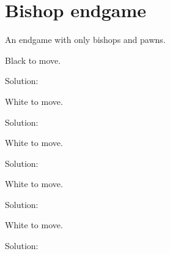 \documentclass{book}
\begin{document}
\section{Bishop endgame}
An endgame with only bishops and pawns.\begin{multicols}{2} 
\begin{samepage} 
\newgame 


 
\showboard
 
 Black to move. 
 
Solution: 
 
\end{samepage}\begin{samepage} 
\newgame 


 
\showboard
 
 White to move. 
 
Solution: 
 
\end{samepage}\begin{samepage} 
\newgame 


 
\showboard
 
 White to move. 
 
Solution: 
 
\end{samepage}\begin{samepage} 
\newgame 


 
\showboard
 
 White to move. 
 
Solution: 
 
\end{samepage}\begin{samepage} 
\newgame 


 
\showboard
 
 White to move. 
 
Solution: 
 
\end{samepage}\end{multicols} 
\newpage 
\end{document}

